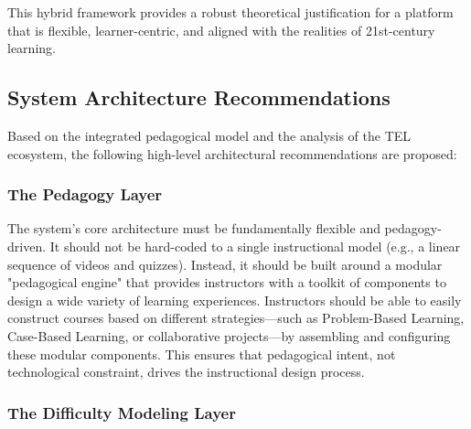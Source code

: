 \documentclass{article}
\begin{document}
This hybrid framework provides a robust theoretical justification for a platform that is flexible, learner-centric, and aligned with the realities of 21st-century learning.

\subsection{System Architecture Recommendations}

Based on the integrated pedagogical model and the analysis of the TEL ecosystem, the following high-level architectural recommendations are proposed:

\subsubsection{The Pedagogy Layer}

The system's core architecture must be fundamentally flexible and pedagogy-driven.\cite{108, 109, 110} It should not be hard-coded to a single instructional model (e.g., a linear sequence of videos and quizzes). Instead, it should be built around a modular "pedagogical engine" that provides instructors with a toolkit of components to design a wide variety of learning experiences. Instructors should be able to easily construct courses based on different strategies—such as Problem-Based Learning, Case-Based Learning, or collaborative projects—by assembling and configuring these modular components. This ensures that pedagogical intent, not technological constraint, drives the instructional design process.\cite{31, 111}

\subsubsection{The Difficulty Modeling Layer}
\end{document}

